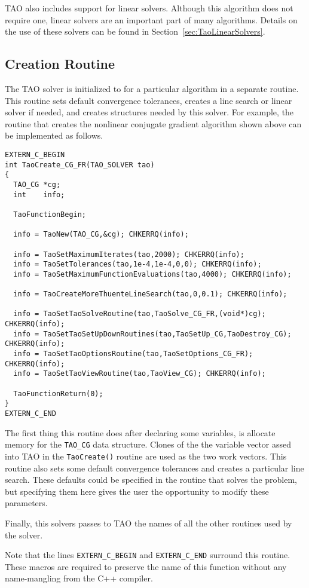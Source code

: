 TAO also includes support for linear solvers.  Although this algorithm
does not require one, linear solvers are an important part of many
algorithms.  Details on the use of these solvers can be found in
Section~\ref{sec:TaoLinearSolvers}.

\subsection{Creation Routine}
The TAO solver is initialized to for a particular algorithm in a separate
routine.  This routine sets default convergence tolerances, creates a
line search or linear solver if needed, and creates structures needed
by this solver.   For example, the routine that creates the nonlinear
conjugate gradient algorithm shown above can be implemented as follows.
\begin{verbatim}
EXTERN_C_BEGIN
int TaoCreate_CG_FR(TAO_SOLVER tao)
{
  TAO_CG *cg;
  int    info;

  TaoFunctionBegin;

  info = TaoNew(TAO_CG,&cg); CHKERRQ(info);

  info = TaoSetMaximumIterates(tao,2000); CHKERRQ(info);
  info = TaoSetTolerances(tao,1e-4,1e-4,0,0); CHKERRQ(info);
  info = TaoSetMaximumFunctionEvaluations(tao,4000); CHKERRQ(info);

  info = TaoCreateMoreThuenteLineSearch(tao,0,0.1); CHKERRQ(info);

  info = TaoSetTaoSolveRoutine(tao,TaoSolve_CG_FR,(void*)cg); CHKERRQ(info);
  info = TaoSetTaoSetUpDownRoutines(tao,TaoSetUp_CG,TaoDestroy_CG); CHKERRQ(info);
  info = TaoSetTaoOptionsRoutine(tao,TaoSetOptions_CG_FR); CHKERRQ(info);
  info = TaoSetTaoViewRoutine(tao,TaoView_CG); CHKERRQ(info);

  TaoFunctionReturn(0);
}
EXTERN_C_END
\end{verbatim}
The first thing this routine does after declaring some variables, is allocate
memory for the {\tt TAO\_CG} data structure.  Clones of the the 
variable vector assed into TAO in the {\tt TaoCreate()} routine 
are used as the two work vectors.
This routine also sets some default convergence tolerances and creates
a particular line search.
These defaults could be specified in the routine that solves the problem,
but specifying them here gives the user the opportunity to modify these
parameters.

Finally, this solvers passes to TAO the names of all the other routines
used by the solver.  

Note that the lines {\tt EXTERN\_C\_BEGIN} and {\tt EXTERN\_C\_END} surround
this routine.  These macros are required to preserve the name of this
function without any name-mangling from the C++ compiler.

